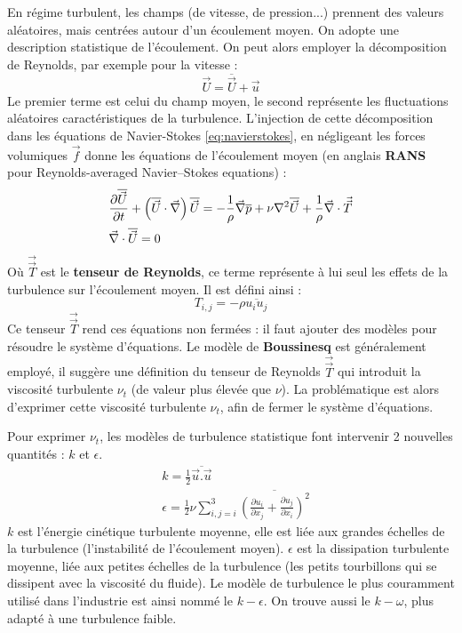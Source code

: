 En régime turbulent, les champs (de vitesse, de pression...) prennent des valeurs aléatoires, mais centrées autour d'un écoulement moyen. On adopte une description statistique de l'écoulement. On peut alors employer la décomposition de Reynolds, par exemple pour la vitesse :
%
\begin{equation}
\vec{U} = \overline{\vec{U}} + \vec{u}
\end{equation}
%
Le premier terme est celui du champ moyen, le second représente les fluctuations aléatoires caractéristiques de la turbulence. L'injection de cette décomposition dans les équations de Navier-Stokes \eqref{eq:navierstokes}, en négligeant les forces volumiques $\vec{f}$ donne les équations de l'écoulement moyen (en anglais \textbf{RANS} pour Reynolds-averaged Navier–Stokes equations) :
%
\begin{align}[left=\empheqlbrace]
 & \frac{ \partial\overline{\vec{U}} }{ \partial t }
 + \left( \overline{\vec{U}} \cdot \vec{\nabla} \right) \overline{\vec{U}}
 = - \frac{1}{\rho} \vec{\nabla} \overline{p}
 + \nu  \nabla^2 \overline{\vec{U}}
 + \frac{1}{\rho} \vec{\nabla} \cdot \vec{\vec{T}} \\
 \notag & \vec{\nabla} \cdot \overline{\vec{U}} = 0
\end{align}
%
Où $\vec{\vec{T}}$ est le \textbf{tenseur de Reynolds}, ce terme représente à lui seul les effets de la turbulence sur l'écoulement moyen. Il est défini ainsi :
%
\begin{equation}
T_{i,j} = - \rho \overline{u_i u_j}
\end{equation}
%
Ce tenseur $\vec{\vec{T}}$ rend ces équations non fermées : il faut ajouter des modèles pour résoudre le système d'équations. Le modèle de \textbf{Boussinesq} est généralement employé, il suggère une définition du tenseur de Reynolds $\vec{\vec{T}}$ qui introduit la viscosité turbulente $\nu_t$ (de valeur plus élevée que $\nu$). La problématique est alors d'exprimer cette viscosité turbulente $\nu_t$, afin de fermer le système d'équations.

Pour exprimer $\nu_t$, les modèles de turbulence statistique font intervenir 2 nouvelles quantités : $k$ et $\epsilon$.
%
\begin{align}
 & k = \frac{1}{2} \overline{\vec{u}.\vec{u}} \\
 & \epsilon = \frac{1}{2} \nu \sum\limits_{i,j=i}^3 \overline{\left(
 \frac{ \partial u_i }{ \partial x_j }
 + \frac{ \partial u_j }{ \partial x_i } \right)^2}
\end{align}
%
$k$ est l'énergie cinétique turbulente moyenne, elle est liée aux grandes échelles de la turbulence (l'instabilité de l'écoulement moyen). $\epsilon$ est la dissipation turbulente moyenne, liée aux petites échelles de la turbulence (les petits tourbillons qui se dissipent avec la viscosité du fluide). Le modèle de turbulence le plus couramment utilisé dans l'industrie est ainsi nommé le $k - \epsilon$. On trouve aussi le $k - \omega$, plus adapté à une turbulence faible.

